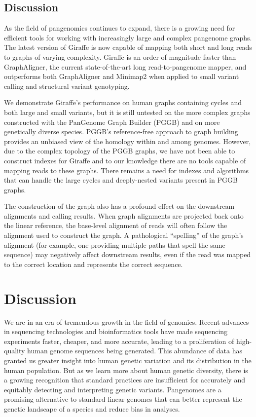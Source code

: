 \documentclass[11pt]{ucscthesis}
\begin{document}
\FloatBarrier

\section{Discussion}

As the field of pangenomics continues to expand, there is a growing need for efficient tools for working with increasingly large and complex pangenome graphs.
The latest version of Giraffe is now capable of mapping both short and long reads to graphs of varying complexity.
Giraffe is an order of magnitude faster than GraphAligner, the current state-of-the-art long read-to-pangenome mapper, and outperforms both GraphAligner and Minimap2 when applied to small variant calling and structural variant genotyping.

We demonstrate Giraffe's performance on human graphs containing cycles and both large and small variants, but it is still untested on the more complex graphs constructed with the PanGenome Graph Builder (PGGB) \citep{pggb_2024} and on more genetically diverse species.
PGGB's reference-free approach to graph building provides an unbiased view of the homology within and among genomes.
However, due to the complex topology of the PGGB graphs, we have not been able to construct indexes for Giraffe and to our knowledge there are no tools capable of mapping reads to these graphs.
There remains a need for indexes and algorithms that can handle the large cycles and deeply-nested variants present in PGGB graphs.

The construction of the graph also has a profound effect on the downstream alignments and calling results.
When graph alignments are projected back onto the linear reference, the base-level alignment of reads will often follow the alignment used to construct the graph.
A pathological ``spelling'' of the graph's alignment (for example, one providing multiple paths that spell the same sequence) may negatively affect downstream results, even if the read was mapped to the correct location and represents the correct sequence.


\chapter{Discussion}

We are in an era of tremendous growth in the field of genomics.
Recent advances in sequencing technologies and bioinformatics tools have made sequencing experiments faster, cheaper, and more accurate, leading to a proliferation of high-quality human genome sequences being generated.
This abundance of data has granted us greater insight into human genetic variation and its distribution in the human population.
But as we learn more about human genetic diversity, there is a growing recognition that standard practices are insufficient for accurately and equitably detecting and interpreting genetic variants. 
Pangenomes are a promising alternative to standard linear genomes that can better represent the genetic landscape of a species and reduce bias in analyses.
\end{document}
